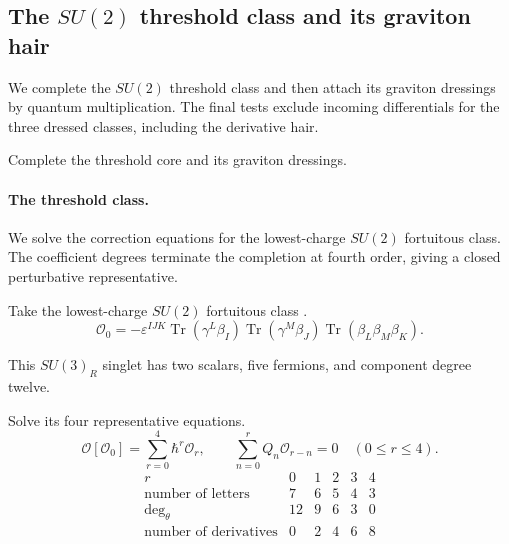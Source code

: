 \documentclass[11pt]{article}
\numberwithin{equation}{section}
\numberwithin{figure}{section}
\numberwithin{table}{section}
\begin{document}
\subsection{The $SU(2)$ threshold class and its graviton hair}\label{sec-fortuitous}

We complete the $SU(2)$ threshold class and then attach its graviton dressings by quantum multiplication. The final tests exclude incoming differentials for the three dressed classes, including the derivative hair.

\begin{proofbox}
Complete the threshold core and its graviton dressings.

\paragraph{The threshold class.}\label{the-threshold-class}

We solve the correction equations for the lowest-charge $SU(2)$ fortuitous class. The coefficient degrees terminate the completion at fourth order, giving a closed perturbative representative.

Take the lowest-charge $SU(2)$ fortuitous class \cite[Section 3.1]{KKLP}.
\begin{equation}\label{eq-threshold-source}
\mathcal O_0=-\varepsilon^{IJK}
\operatorname{Tr}(\gamma^L\beta_I)
\operatorname{Tr}(\gamma^M\beta_J)
\operatorname{Tr}(\beta_L\beta_M\beta_K).
\end{equation}

This $SU(3)_R$ singlet has two scalars, five fermions, and component degree twelve.

Solve its four representative equations.
\begin{equation}\label{eq-threshold-completion}
\mathcal O[\mathcal O_0]=\sum_{r=0}^{4}\hbar^r\mathcal O_r,
\qquad
\sum_{n=0}^{r}Q_n\mathcal O_{r-n}=0
\quad(0\le r\le4).
\end{equation}
\begin{equation}\label{b-00834}
\begin{array}{c|rrrrr}
r&0&1&2&3&4\\\hline
\text{number of letters}&7&6&5&4&3\\
\deg_\theta&12&9&6&3&0\\
\text{number of derivatives}&0&2&4&6&8
\end{array}
\end{equation}


\end{proofbox}
\end{document}
